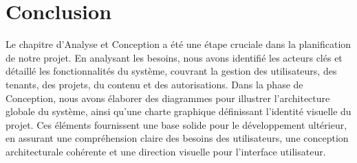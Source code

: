




\newpage

\section*{Conclusion}


\hspace{\parindent}Le chapitre d'Analyse et Conception a été une étape cruciale dans la planification de notre projet. En analysant les besoins, nous avons identifié les acteurs clés et détaillé les fonctionnalités du système, couvrant la gestion des utilisateurs, des tenants, des projets, du contenu et des autorisations. Dans la phase de Conception, nous avons élaborer des diagrammes pour illustrer l'architecture globale du système, ainsi qu'une charte graphique définissant l'identité visuelle du projet. Ces éléments fournissent une base solide pour le développement ultérieur, en assurant une compréhension claire des besoins des utilisateurs, une conception architecturale cohérente et une direction visuelle pour l'interface utilisateur.



























